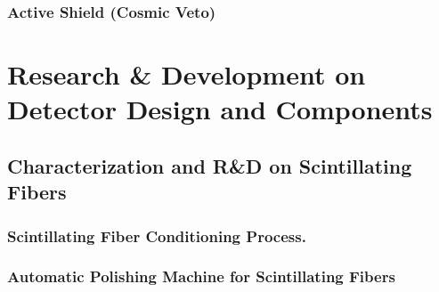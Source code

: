 \documentclass[12pt,a4paper]{book}
\begin{document}
		\subsection{Active Shield (Cosmic Veto)}\label{subsec:SetUpActiveShield}
		
		\newpage
					
\chapter[TRITIUM Detector R\&D]{Research \& Development on Detector Design and Components}\label{chap:ResearchandDevelopment}
	
	
	\section[Characetrization of the Scintillating Fibers]{Characterization and R\&D on Scintillating Fibers}\label{sec:CharacterizationScintillatingFibers}
	
		
		
		\subsection[Conditioning Process]{Scintillating Fiber Conditioning Process.}\label{subsec:ConditioningProcess}
		
				
		\subsection[Automatic Polishing Machine]{Automatic Polishing Machine for Scintillating Fibers}\label{subsec:PolishingMachine}
		
		
\end{document}
